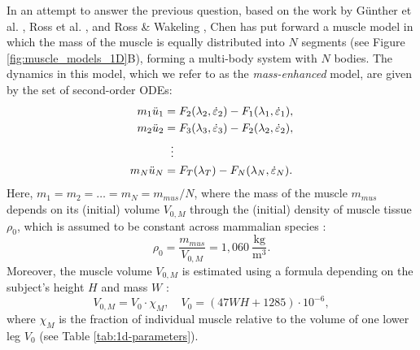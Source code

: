 \documentclass{sfuthesis}
\numberwithin{equation}{section}
\numberwithin{figure}{chapter}
\numberwithin{table}{chapter}
\theoremstyle{definition}
\newcommand{\depsilon}{\dot{\varepsilon}}
\begin{document}
In an attempt to answer the previous question, based on the work by G\"{u}nther et al. \cite{Gunther2012}, Ross et al. \cite{Ross2018}, and Ross \& Wakeling \cite{RossWakeling2016Multibody, Paper4_RossWakeling2021}, Chen \cite{EvanThesis} has put forward a muscle model in which the mass of the muscle is equally distributed into $N$ segments (see Figure \ref{fig:muscle_models_1D}B), forming a multi-body system with $N$ bodies. The dynamics in this model, which we refer to as the \textit{mass-enhanced} model, are given by the set of second-order ODEs:
\begin{subequations} \label{eq:massenhanced_model}
    \begin{align}
        m_1 \ddot{u}_1 &= F_2(\lambda_2, \depsilon_2) - F_1(\lambda_1, \depsilon_1), \\
        m_2 \ddot{u}_2 &= F_3(\lambda_3, \depsilon_3) - F_2(\lambda_2, \depsilon_2), \\
        &\hspace{0.6em} \vdots \notag \\
        m_N \ddot{u}_N &= F_T(\lambda_T) - F_N(\lambda_N, \depsilon_N).
    \end{align}
\end{subequations}
Here, $m_1 = m_2 = \dots = m_N = m_{mus}/N$, where the mass of the muscle $m_{mus}$ depends on its (initial) volume $V_{0,M}$ through the (initial) density of muscle tissue $\rho_0$, which is assumed to be constant across mammalian species \cite{MendezKeys1960}:
\begin{equation}
    \rho_0 = \dfrac{m_{mus}}{V_{0,M}} = 1,060 \ \dfrac{\text{kg}}{\text{m}^3}.
\end{equation}
Moreover, the muscle volume $V_{0,M}$ is estimated using a formula depending on the subject's height $H$ and mass $W$ \cite{Hansfield2014}:
\begin{equation}
    V_{0,M} = V_0 \cdot \chi_M, \quad V_0 = (47WH + 1285) \cdot 10^{-6},
\end{equation}
where $\chi_M$ is the fraction of individual muscle relative to the volume of one lower leg $V_0$ (see Table \ref{tab:1d-parameters}).
\end{document}
